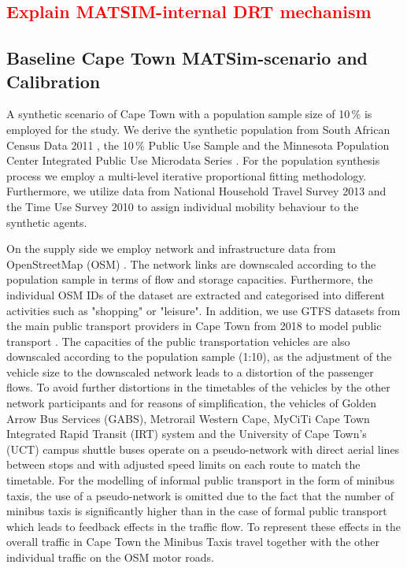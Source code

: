 \documentclass[main.tex]{subfiles}
\begin{document}
\subsection*{\textcolor{red}{Explain MATSIM-internal DRT mechanism}}

\subsection*{Baseline Cape Town MATSim-scenario and Calibration}

A synthetic scenario of Cape Town with a population sample size of 10\,\% is employed for the study. We derive the synthetic population from South African Census Data 2011 \citep{census2011}, the 10\,\% Public Use Sample \citep{census2011public10pct} and the Minnesota Population Center Integrated Public Use Microdata Series \citep{mpc2020}. For the population synthesis process we employ a multi-level iterative proportional fitting methodology.  Furthermore, we utilize data from National Household Travel Survey 2013 \citep{nhts2013} and the Time Use Survey 2010 \citep{tus20NationalHouseholdTravelSurvey13} to assign individual mobility behaviour to the synthetic agents. 

On the supply side we employ network and infrastructure data from OpenStreetMap (OSM) \citep{osm}. The network links are downscaled according to the population sample in terms of flow and storage capacities. Furthermore, the individual OSM IDs of the dataset are extracted and categorised into different activities such as "shopping" or "leisure". In addition, we use GTFS datasets from the main public transport providers in Cape Town from 2018 to model public transport \citep{transifeeds}. The capacities of the public transportation vehicles are also downscaled according to the population sample (1:10), as the adjustment of the vehicle size to the downscaled network leads to a distortion of the passenger flows. To avoid further distortions in the timetables of the vehicles by the other network participants and for reasons of simplification, the vehicles of Golden Arrow Bus Services (GABS), Metrorail Western Cape, MyCiTi Cape Town Integrated Rapid Transit (IRT) system and the University of Cape Town's (UCT) campus shuttle buses operate on a pseudo-network with direct aerial lines between stops and with adjusted speed limits on each route to match the timetable. For the modelling of informal public transport in the form of minibus taxis, the use of a pseudo-network is omitted due to the fact that the number of minibus taxis is significantly higher than in the case of formal public transport which leads to feedback effects in the traffic flow. To represent these effects in the overall traffic in Cape Town the Minibus Taxis travel together with the other individual traffic on the OSM motor roads. 
\end{document}
